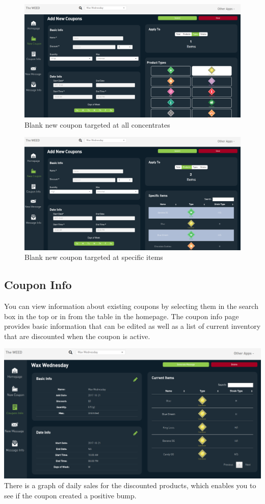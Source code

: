 \documentclass[]{book}
\theoremstyle{definition}
\theoremstyle{definition}
\theoremstyle{definition}
\theoremstyle{remark}
\begin{document}
\begin{figure}
\centering
\includegraphics{images/C2.png}
\caption{Blank new coupon targeted at all concentrates}
\end{figure}

\begin{figure}
\centering
\includegraphics{images/C3.png}
\caption{Blank new coupon targeted at specific items}
\end{figure}

\subsection{Coupon Info}\label{coupon-info}

You can view information about existing coupons by selecting them in the
search box in the top or in from the table in the homepage. The coupon
info page provides basic information that can be edited as well as a
list of current inventory that are discounted when the coupon is active.

\includegraphics{images/C4.png} There is a graph of daily sales for the
discounted products, which enables you to see if the coupon created a
positive bump.
\end{document}
